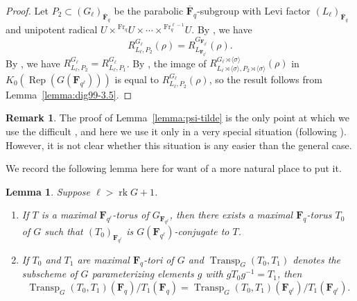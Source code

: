 \documentclass[11pt,reqno]{amsart}
\newtheorem{lemma}[theorem]{Lemma}
\theoremstyle{definition}
\newtheorem{remark}[theorem]{Remark}
\newcommand{\F}{{\mathbf F}}
\DeclareMathOperator{\Fr}{Fr}
\DeclareMathOperator{\Rep}{Rep}
\DeclareMathOperator{\rk}{rk}
\DeclareMathOperator{\Transp}{Transp}
\newcommand{\ol}[1]{\overline{#1}}
\begin{document}
\begin{proof}
    Let $P_2 \subset (G_\ell)_{\ol\F_q}$ be the parabolic $\ol\F_q$-subgroup with Levi factor $(L_\ell)_{\ol\F_q}$ and unipotent radical $U \times {}^{\Fr_q}U \times \cdots \times {}^{\Fr_q^{\ell-1}}U$. By \cite[Corollaire 3.2]{Dig99}, we have
    \[
    R_{L_\ell, P_2}^{G_\ell}(\rho) = R_{L_{\F_{q^\ell}}}^{G_{\F_{q^\ell}}}(\rho).
    \]
    By \cite[Theorem 8.7.2]{GRV26}, we have $R_{L_\ell, P_2}^{G_\ell} = R_{L_\ell, P_1}^{G_\ell}$. By \cite[Corollaire 2.4]{DM94}, the image of $R_{L_\ell\rtimes\langle\sigma\rangle, P_2\rtimes\langle\sigma\rangle}^{G_\ell\rtimes\langle\sigma\rangle}(\rho)$ in $K_0(\Rep(G(\F_{q^\ell})))$ is equal to $R_{L_\ell,P_2}^{G_\ell}(\rho)$, so the result follows from Lemma~\ref{lemma:dig99-3.5}.
\end{proof}

\begin{remark}
    The proof of Lemma~\ref{lemma:psi-tilde} is the only point at which we use the difficult \cite[Theorem 8.7.2]{GRV26}, and here we use it only in a very special situation (following \cite{Dig99}). However, it is not clear whether this situation is any easier than the general case.
\end{remark}

We record the following lemma here for want of a more natural place to put it.

\begin{lemma}\label{lemma:tori-descend}
    Suppose $\ell > \rk G + 1$.
    \begin{enumerate}
        \item If $T$ is a maximal $\F_{q^\ell}$-torus of $G_{\F_{q^\ell}}$, then there exists a maximal $\F_q$-torus $T_0$ of $G$ such that $(T_0)_{\F_{q^\ell}}$ is $G(\F_{q^\ell})$-conjugate to $T$.
        \item If $T_0$ and $T_1$ are maximal $\F_q$-tori of $G$ and $\Transp_G(T_0, T_1)$ denotes the subscheme of $G$ parameterizing elements $g$ with $gT_0g^{-1} = T_1$, then
        \[
        \Transp_G(T_0, T_1)(\F_q)/T_1(\F_q) = \Transp_G(T_0, T_1)(\F_{q^\ell})/T_1(\F_{q^\ell}).
        \]
    \end{enumerate}
\end{lemma}
\end{document}
